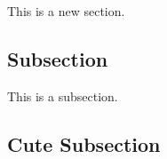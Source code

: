 This is a new section. 
\subsection{Subsection}
This is a subsection. 

\subsection{Cute Subsection}

